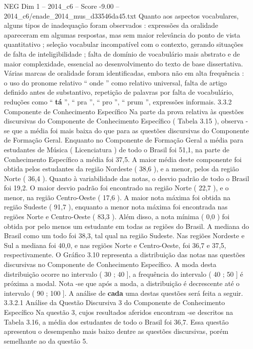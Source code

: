 \begin{textsample}{NEG Dim 1 – 2014\_c6 – Score -9.00 – 2014\_c6/enade\_2014\_mus\_d33546da45.txt}
Quanto aos aspectos vocabulares, alguns tipos de inadequação foram observados : expressões da oralidade apareceram em algumas respostas, mas sem maior relevância do ponto de vista quantitativo ; seleção vocabular incompatível com o contexto, gerando situações de falta de inteligibilidade ; falta de domínio de vocabulário mais abstrato e de maior complexidade, essencial ao desenvolvimento do texto de base dissertativa.
Várias marcas de oralidade foram identificadas, embora não em alta frequência : o uso do pronome relativo “ onde ” como relativo universal, falta de artigo definido antes de substantivo, repetição de palavras por falta de vocabulário, reduções como “ \textbf{tá} ”, “ pra ”, “ pro ”, “ prum ”, expressões informais. 3.3.2 Componente de Conhecimento Específico Na parte da prova relativa às questões discursivas do Componente de Conhecimento Específico ( Tabela 3.15 ), observa -se que a média foi mais baixa do que para as questões discursivas do Componente de Formação Geral.
Enquanto no Componente de Formação Geral a média para estudantes de Música ( Licenciatura ) de todo o Brasil foi 51,1, na parte de Conhecimento Específico a média foi 37,5.
A maior média deste componente foi obtida pelos estudantes da região Nordeste ( 38,6 ), e a menor, pelos da região Norte ( 36,4 ).
Quanto à variabilidade das notas, o desvio padrão de todo o Brasil foi 19,2.
O maior desvio padrão foi encontrado na região Norte ( 22,7 ), e o menor, na região Centro-Oeste ( 17,6 ).
A maior nota máxima foi obtida na região Sudeste ( 91,7 ), enquanto a menor nota máxima foi encontrada nas regiões Norte e Centro-Oeste ( 83,3 ).
Além disso, a nota mínima ( 0,0 ) foi obtida por pelo menos um estudante em todas as regiões do Brasil.
A mediana do Brasil como um todo foi 38,3, tal qual na região Sudeste.
Nas regiões Nordeste e Sul a mediana foi 40,0, e nas regiões Norte e Centro-Oeste, foi 36,7 e 37,5, respectivamente.
O Gráfico 3.10 representa a distribuição das notas nas questões discursivas no Componente de Conhecimento Específico.
A moda desta distribuição ocorre no intervalo ( 30 ; 40 ], a frequência do intervalo ( 40 ; 50 ] é próxima a modal.
Nota -se que após a moda, a distribuição é decrescente até o intervalo ( 90 ; 100 ].
A análise de \textbf{cada} uma destas questões será feita a seguir. 3.3.2.1 Análise da Questão Discursiva 3 do Componente de Conhecimento Específico Na questão 3, cujos resultados aferidos encontram -se descritos na Tabela 3.16, a média dos estudantes de todo o Brasil foi 36,7.
Essa questão apresentou o desempenho mais baixo dentre as questões discursivas, porém semelhante ao da questão 5.

\end{textsample}

